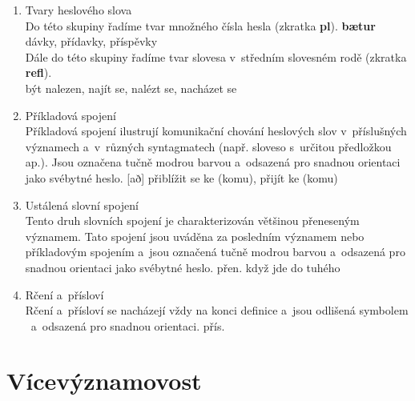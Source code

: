 \begin{enumerate}
\item Tvary heslového slova\\
Do této skupiny řadíme tvar množného čísla hesla (zkratka \textbf{pl}).
\blspace
\dicEntry {}   \textbf{bætur}  {dávky, přídavky, příspěvky}\\

Dále do této skupiny řadíme tvar slovesa v~středním slovesném rodě (zkratka \textbf{refl}).\\

\dicEntry {}    {}  {být nalezen, najít se, nalézt se, nacházet se}
\blspace
\item Příkladová spojení\\
Příkladová spojení ilustrují komunikační chování heslových slov v~příslušných významech a~v~různých syntagmatech (např. sloveso s~určitou předložkou ap.). Jsou označena tučně modrou barvou a~odsazená pro snadnou orientaci jako svébytné heslo.
\blspace
\dicEntry {}   [að] {} {přiblížit se ke (komu), přijít ke (komu)}
\blspace
\item Ustálená slovní spojení\\
Tento druh slovních spojení je charakterizován většinou přeneseným významem. Tato spojení jsou uváděna za posledním významem nebo příkladovým spojením a~jsou označená tučně modrou barvou a~odsazená pro snadnou orientaci jako svébytné heslo.
\blspace
\dicEntry {}    {} {\footnotesize{přen.}} {když jde do tuhého}
\blspace
\item Rčení a~přísloví\\
Rčení a~přísloví se nacházejí vždy na konci definice a~jsou odlišená symbolem \dicsymProverb\ a~odsazená pro snadnou orientaci.
\blspace
\dicEntry {}   \dicProverb{}  {\footnotesize{přís.}} 
\end{enumerate}

\section{Vícevýznamovost}

